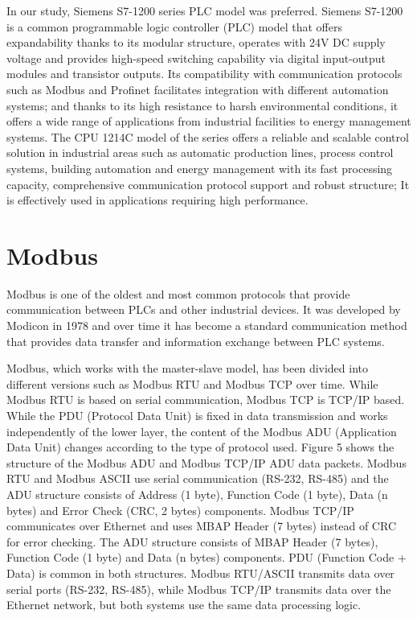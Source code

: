         In our study, Siemens S7-1200 series PLC model was preferred. Siemens S7-1200 is a common programmable logic controller (PLC) model that offers expandability thanks to its modular structure, operates with 24V DC supply voltage and provides high-speed switching capability via digital input-output modules and transistor outputs. Its compatibility with communication protocols such as Modbus and Profinet facilitates integration with different automation systems; and thanks to its high resistance to harsh environmental conditions, it offers a wide range of applications from industrial facilities to energy management systems. The CPU 1214C model of the series offers a reliable and scalable control solution in industrial areas such as automatic production lines, process control systems, building automation and energy management with its fast processing capacity, comprehensive communication protocol support and robust structure; It is effectively used in applications requiring high performance.



       
\section{Modbus}

Modbus is one of the oldest and most common protocols that provide communication between PLCs and other industrial devices. It was developed by Modicon in 1978 and over time it has become a standard communication method that provides data transfer and information exchange between PLC systems.

Modbus, which works with the master-slave model, has been divided into different versions such as Modbus RTU and Modbus TCP over time. While Modbus RTU is based on serial communication, Modbus TCP is TCP/IP based. While the PDU (Protocol Data Unit) is fixed in data transmission and works independently of the lower layer, the content of the Modbus ADU (Application Data Unit) changes according to the type of protocol used. Figure 5 shows the structure of the Modbus ADU and Modbus TCP/IP ADU data packets. Modbus RTU and Modbus ASCII use serial communication (RS-232, RS-485) and the ADU structure consists of Address (1 byte), Function Code (1 byte), Data (n bytes) and Error Check (CRC, 2 bytes) components. Modbus TCP/IP communicates over Ethernet and uses MBAP Header (7 bytes) instead of CRC for error checking. The ADU structure consists of MBAP Header (7 bytes), Function Code (1 byte) and Data (n bytes) components. PDU (Function Code + Data) is common in both structures. Modbus RTU/ASCII transmits data over serial ports (RS-232, RS-485), while Modbus TCP/IP transmits data over the Ethernet network, but both systems use the same data processing logic. 

